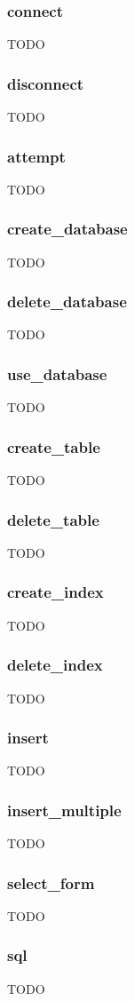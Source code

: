 \documentclass{article}
\begin{document}
\subsubsection*{connect}
TODO
\subsubsection*{disconnect}
TODO
\subsubsection*{attempt}
TODO
\subsubsection*{create\_database}
TODO
\subsubsection*{delete\_database}
TODO
\subsubsection*{use\_database}
TODO
\subsubsection*{create\_table}
TODO
\subsubsection*{delete\_table}
TODO
\subsubsection*{create\_index}
TODO
\subsubsection*{delete\_index}
TODO
\subsubsection*{insert}
TODO
\subsubsection*{insert\_multiple}
TODO
\subsubsection*{select\_form}
TODO
\subsubsection*{sql}
TODO
\end{document}
